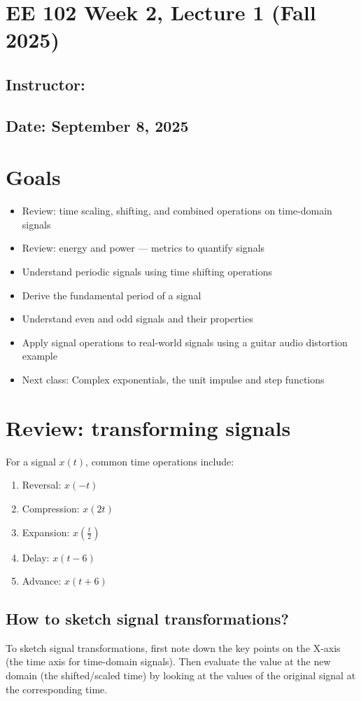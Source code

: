 \documentclass{ee102_notes}
\renewcommand{\releasedate}{September 8, 2025}
\begin{document}
\section*{EE 102 Week 2, Lecture 1 (Fall 2025)}
\subsection*{Instructor: \instructor}
\subsection*{Date: \releasedate}
\section{Goals}
\begin{itemize}
    \item Review: time scaling, shifting, and combined operations on time-domain signals
    \item Review: energy and power --- metrics to quantify signals
    \item Understand periodic signals using time shifting operations
    \item Derive the fundamental period of a signal
    \item Understand even and odd signals and their properties   
    \item Apply signal operations to real-world signals using a guitar audio distortion example
    \item Next class: Complex exponentials, the unit impulse and step functions
\end{itemize}

\section{Review: transforming signals}
For a signal $x(t)$, common time operations include:
\begin{enumerate}
    \item Reversal: $x(-t)$
    \item Compression: $x(2t)$
    \item Expansion: $x\!\left(\tfrac{t}{2}\right)$
    \item Delay: $x(t-6)$
    \item Advance: $x(t+6)$
\end{enumerate}

\subsection{How to sketch signal transformations?} 
To sketch signal transformations, first note down the key points on the X-axis (the time axis for time-domain signals). Then evaluate the value at the new domain (the shifted/scaled time) by looking at the values of the original signal at the corresponding time.
\end{document}
